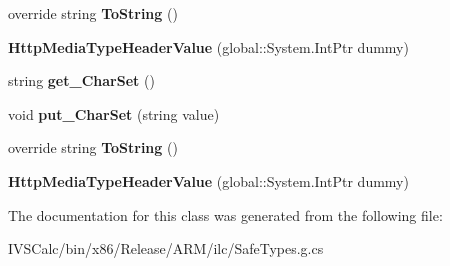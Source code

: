 \begin{DoxyCompactItemize}
override string {\bfseries To\+String} ()
\item 
\mbox{\label{class_windows_1_1_web_1_1_http_1_1_headers_1_1_http_media_type_header_value_a4111f9bad6c290d76711295c76b0e446}} 
{\bfseries Http\+Media\+Type\+Header\+Value} (global\+::\+System.\+Int\+Ptr dummy)
\item 
\mbox{\label{class_windows_1_1_web_1_1_http_1_1_headers_1_1_http_media_type_header_value_a6e28ced5d2ea9407d6ad645ab6431386}} 
string {\bfseries get\+\_\+\+Char\+Set} ()
\item 
\mbox{\label{class_windows_1_1_web_1_1_http_1_1_headers_1_1_http_media_type_header_value_a0371cf69feb10328cf6620ba90e6e743}} 
void {\bfseries put\+\_\+\+Char\+Set} (string value)
\item 
\mbox{\label{class_windows_1_1_web_1_1_http_1_1_headers_1_1_http_media_type_header_value_afaf2b25a5d6a3522aa8123d6489aaeb1}} 
override string {\bfseries To\+String} ()
\item 
\mbox{\label{class_windows_1_1_web_1_1_http_1_1_headers_1_1_http_media_type_header_value_a4111f9bad6c290d76711295c76b0e446}} 
{\bfseries Http\+Media\+Type\+Header\+Value} (global\+::\+System.\+Int\+Ptr dummy)
\end{DoxyCompactItemize}


The documentation for this class was generated from the following file\+:\begin{DoxyCompactItemize}
\item 
I\+V\+S\+Calc/bin/x86/\+Release/\+A\+R\+M/ilc/Safe\+Types.\+g.\+cs\end{DoxyCompactItemize}
